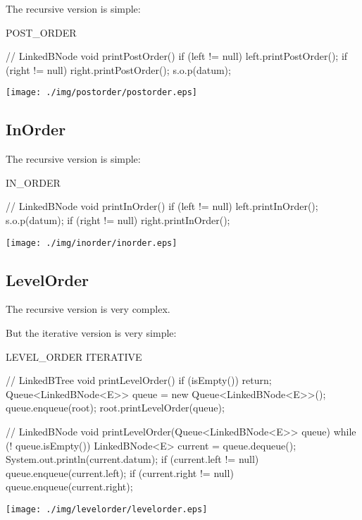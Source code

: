 \documentclass[a4paper, 9pt]{extarticle}
\begin{document}
The recursive version is simple:

\begin{multicols}{2}
\begin{blackboard}
      POST_ORDER

// LinkedBNode
void printPostOrder() {
  if (left != null) {
    left.printPostOrder();
  }
  if (right != null) {
    right.printPostOrder();
  }
  s.o.p(datum);
}
\end{blackboard}
\columnbreak
\texttt{[image: ./img/postorder/postorder.eps]}
\end{multicols}

\subsection{InOrder}

The recursive version is simple:

\begin{multicols}{2}
\begin{blackboard}
      IN_ORDER

// LinkedBNode
void printInOrder() {
  if (left != null) {
    left.printInOrder();
  }
  s.o.p(datum);
  if (right != null) {
    right.printInOrder();
  }
}
\end{blackboard}
\columnbreak
\texttt{[image: ./img/inorder/inorder.eps]}
\end{multicols}

\newpage
\subsection{LevelOrder}

The recursive version is very complex.

But the iterative version is very simple:

\begin{multicols}{2}
\begin{blackboard}
      LEVEL_ORDER ITERATIVE

// LinkedBTree
void printLevelOrder() {
  if (isEmpty()) {
    return;
  }
  Queue<LinkedBNode<E>> queue =
                   new Queue<LinkedBNode<E>>();
  queue.enqueue(root);
  root.printLevelOrder(queue);
}

// LinkedBNode
void printLevelOrder(Queue<LinkedBNode<E>> queue) {
  while (! queue.isEmpty()) {
    LinkedBNode<E> current = queue.dequeue();
    System.out.println(current.datum);
    if (current.left != null) {
      queue.enqueue(current.left);
    }
    if (current.right != null) {
      queue.enqueue(current.right);
    }
  }
}
\end{blackboard}
\columnbreak
\texttt{[image: ./img/levelorder/levelorder.eps]}
\end{multicols}
\end{document}
